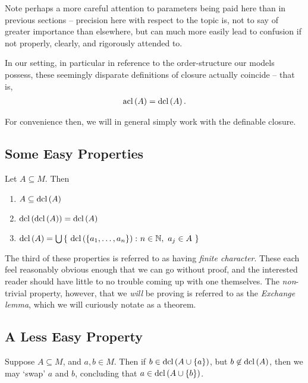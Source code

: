 Note perhaps a more careful attention to parameters being paid here than in previous sections -- precision here with respect to the topic is, not to say of greater importance than elsewhere, but can much more easily lead to confusion if not properly, clearly, and rigorously attended to.


In our setting, in particular in reference to the order-structure our models possess, these seemingly disparate definitions of closure actually coincide -- that is,
\begin{align*}
  \operatorname{acl}\left(A\right) = \operatorname{dcl}\left(A\right).
\end{align*}

For convenience then, we will in general simply work with the definable closure.

\subsection{Some Easy Properties}

\begin{proposition}
\leavevmode
Let $A \subseteq M$. Then
  \begin{enumerate}
    \item $A \subseteq \operatorname{dcl}\left(A\right)$
    \item $\operatorname{dcl}\left(\operatorname{dcl}\left(A\right)\right) = \operatorname{dcl}\left(A\right)$
    \item $\dcl{A} = \bigcup \left\{ \ \dcl{\{a_1, \hdots, a_n\}} \colon n \in \N, \ a_j \in A \ \right\}$
  \end{enumerate}
\end{proposition}

The third of these properties is referred to as having \emph{finite character}. These each feel reasonably obvious enough that we can go without proof, and the interested reader should have little to no trouble coming up with one themselves. The \emph{non}-trivial property, however, that we \emph{will} be proving is referred to as the \emph{Exchange lemma}, which we will curiously notate as a theorem.

\subsection{A Less Easy Property}

\begin{theorem}
  \label{thm:exchange}
  Suppose $A \subseteq M$, and $a, b \in M$. Then if $b \in \operatorname{dcl}\left(A \cup \{ a \}\right)$, but $b \not\in \operatorname{dcl}\left(A\right)$, then we may `swap' $a$ and $b$, concluding that $a \in \operatorname{dcl}\left(A \cup \{ b \}\right)$.
\end{theorem}

